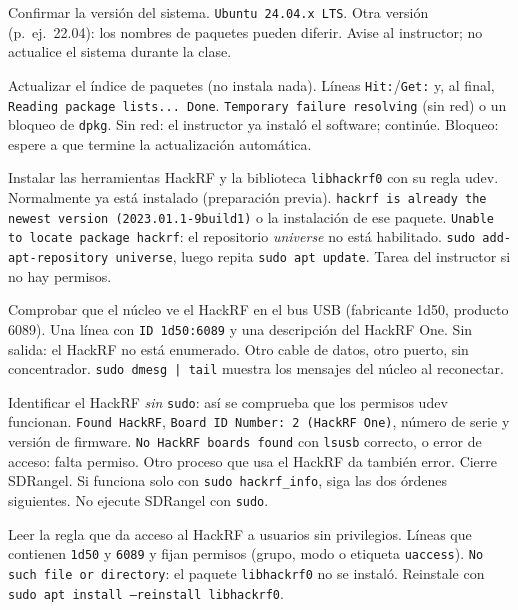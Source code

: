 {Confirmar la versión del sistema.}
{\texttt{Ubuntu 24.04.x LTS}.}
{Otra versión (p.\ ej.\ 22.04): los nombres de paquetes pueden diferir.}
{Avise al instructor; no actualice el sistema durante la clase.}

{Actualizar el índice de paquetes (no instala nada).}
{Líneas \texttt{Hit:}/\texttt{Get:} y, al final, \texttt{Reading package lists... Done}.}
{\texttt{Temporary failure resolving} (sin red) o un bloqueo de \texttt{dpkg}.}
{Sin red: el instructor ya instaló el software; continúe. Bloqueo: espere a que termine la actualización automática.}

{Instalar las herramientas HackRF y la biblioteca \texttt{libhackrf0} con su regla udev. Normalmente ya está instalado (preparación previa).}
{\texttt{hackrf is already the newest version (2023.01.1-9build1)} o la instalación de ese paquete.}
{\texttt{Unable to locate package hackrf}: el repositorio \emph{universe} no está habilitado.}
{\texttt{sudo add-apt-repository universe}, luego repita \texttt{sudo apt update}. Tarea del instructor si no hay permisos.}

{Comprobar que el núcleo ve el HackRF en el bus USB (fabricante 1d50, producto 6089).}
{Una línea con \texttt{ID 1d50:6089} y una descripción del HackRF One.}
{Sin salida: el HackRF no está enumerado.}
{Otro cable de datos, otro puerto, sin concentrador. \texttt{sudo dmesg | tail} muestra los mensajes del núcleo al reconectar.}

{Identificar el HackRF \emph{sin} \texttt{sudo}: así se comprueba que los permisos udev funcionan.}
{\texttt{Found HackRF}, \texttt{Board ID Number: 2 (HackRF One)}, número de serie y versión de firmware.}
{\texttt{No HackRF boards found} con \texttt{lsusb} correcto, o error de acceso: falta permiso. Otro proceso que usa el HackRF da también error.}
{Cierre SDRangel. Si funciona solo con \texttt{sudo hackrf\_info}, siga las dos órdenes siguientes. No ejecute SDRangel con \texttt{sudo}.}

{Leer la regla que da acceso al HackRF a usuarios sin privilegios.}
{Líneas que contienen \texttt{1d50} y \texttt{6089} y fijan permisos (grupo, modo o etiqueta \texttt{uaccess}).}
{\texttt{No such file or directory}: el paquete \texttt{libhackrf0} no se instaló.}
{Reinstale con \texttt{sudo apt install --reinstall libhackrf0}.}

